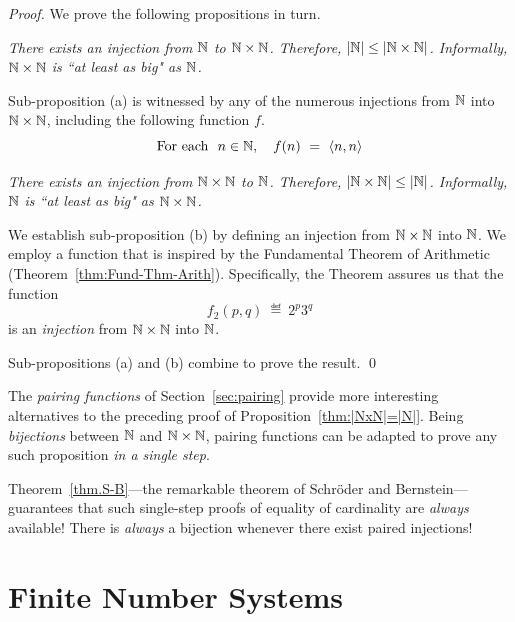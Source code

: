 \begin{proof}
We prove the following propositions in turn.

\medskip

{\em There exists an injection from $\mathbb{N}$ to $\mathbb{N} \times \mathbb{N}$.  Therefore, $|\mathbb{N}| \leq |\mathbb{N} \times \mathbb{N}|$. Informally, $\mathbb{N} \times \mathbb{N}$ is ``at least as big" as $\mathbb{N}$.}

\smallskip

\noindent
Sub-proposition (a) is witnessed by any of the numerous injections from $\mathbb{N}$ into $\mathbb{N} \times \mathbb{N}$, including the following function $f$.
\[ \mbox{For each } \ n \in \mathbb{N}, \ \ \ f(n) \ = \ \langle n,n \rangle \]

\medskip

{\em There exists an injection from $\mathbb{N} \times \mathbb{N}$ to $\mathbb{N}$.  Therefore, $|\mathbb{N} \times \mathbb{N}| \leq |\mathbb{N}|$. Informally, $\mathbb{N}$ is ``at least as big" as $\mathbb{N} \times \mathbb{N}$.}

\smallskip

\noindent
We establish sub-proposition (b) by defining an injection from $\mathbb{N} \times \mathbb{N}$ into $\mathbb{N}$.  We employ a function that is inspired by the Fundamental Theorem of Arithmetic (Theorem~\ref{thm:Fund-Thm-Arith}).  Specifically, the Theorem assures us that the function
\[ f_2(p,q) \ \eqdef \ 2^p 3^q \]
is an {\em injection} from $\mathbb{N} \times \mathbb{N}$ into $\mathbb{N}$.

\medskip

Sub-propositions (a) and (b) combine to prove the result.  \qed
\end{proof}

\bigskip

The {\it pairing functions} of Section~\ref{sec:pairing} provide more interesting alternatives to the preceding proof of Proposition~\ref{thm:|NxN|=|N|}.  Being {\em bijections} between $\mathbb{N}$ and $\mathbb{N} \times \mathbb{N}$, pairing functions can be adapted to prove any such proposition {\em in a single step}. 

\medskip

Theorem~\ref{thm.S-B}---the remarkable theorem of Schr\"{o}der and Bernstein---guarantees that such single-step proofs of equality of cardinality are {\em always} available!  There is {\em always} a bijection whenever there exist paired injections!

\section{Finite Number Systems}
\label{sec:congruences+modular}

